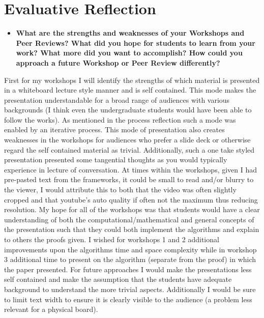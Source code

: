 \documentclass[12pt]{article}
\begin{document}
\section{Evaluative Reflection}
\begin{itemize}
    \item \textbf{What are the strengths and weaknesses of your Workshops and Peer Reviews? What did you hope for students to learn from your work? What more did you want to accomplish? How could you approach a future Workshop or Peer Review differently?}
\end{itemize}

First for my workshops I will identify the strengths of which material is presented in a whiteboard lecture style manner and is self contained. This mode makes the presentation understandable for a broad range of audiences with various backgrounds (I think even the undergraduate students would have been able to follow the works). As mentioned in the process reflection such a mode was enabled by an iterative process. This mode of presentation also creates weaknesses in the workshops for audiences who prefer a slide deck or otherwise regard the self contained material as trivial. Additionally, such a one take styled presentation presented some tangential thoughts as you would typically experience in lecture of conversation. At times within the workshops, given I had pre-pasted text from the frameworks, it could be small to read and/or blurry to the viewer, I would attribute this to both that the video was often slightly cropped and that youtube's auto quality if often not the maximum thus reducing resolution. My hope for all of the workshops was that students would have a clear understanding of both the computational/mathematical and general concepts of the presentation such that they could both implement the algorithms and explain to others the proofs given. I wished for workshops 1 and 2 additional improvements upon the algorithms time and space complexity while in workshop 3 additional time to present on the algorithm (separate from the proof) in which the paper presented. For future approaches I would make the presentations less self contained and make the assumption that the students have adequate background to understand the more trivial aspects. Additionally I would be sure to limit text width to ensure it is clearly visible to the audience (a problem less relevant for a physical board). 
\end{document}
